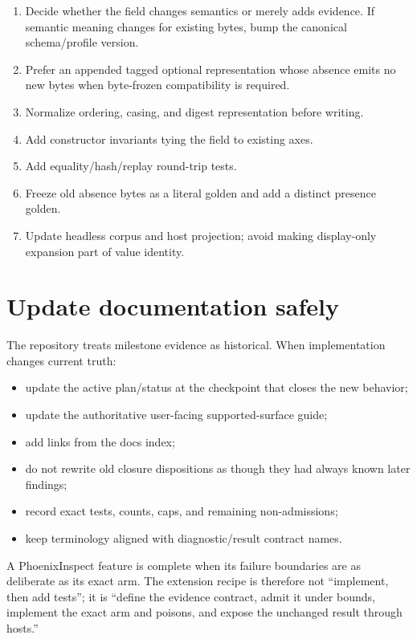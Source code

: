 \documentclass[11pt,oneside,openany]{book}
\begin{document}
\begin{enumerate}
  \item Decide whether the field changes semantics or merely adds evidence. If semantic meaning changes for existing bytes, bump the canonical schema/profile version.
  \item Prefer an appended tagged optional representation whose absence emits no new bytes when byte-frozen compatibility is required.
  \item Normalize ordering, casing, and digest representation before writing.
  \item Add constructor invariants tying the field to existing axes.
  \item Add equality/hash/replay round-trip tests.
  \item Freeze old absence bytes as a literal golden and add a distinct presence golden.
  \item Update headless corpus and host projection; avoid making display-only expansion part of value identity.
\end{enumerate}

\section{Update documentation safely}

The repository treats milestone evidence as historical. When implementation changes current truth:

\begin{itemize}
  \item update the active plan/status at the checkpoint that closes the new behavior;
  \item update the authoritative user-facing supported-surface guide;
  \item add links from the docs index;
  \item do not rewrite old closure dispositions as though they had always known later findings;
  \item record exact tests, counts, caps, and remaining non-admissions;
  \item keep terminology aligned with diagnostic/result contract names.
\end{itemize}

\begin{takeaway}
A PhoenixInspect feature is complete when its failure boundaries are as deliberate as its exact arm. The extension recipe is therefore not ``implement, then add tests''; it is ``define the evidence contract, admit it under bounds, implement the exact arm and poisons, and expose the unchanged result through hosts.''
\end{takeaway}
\end{document}

